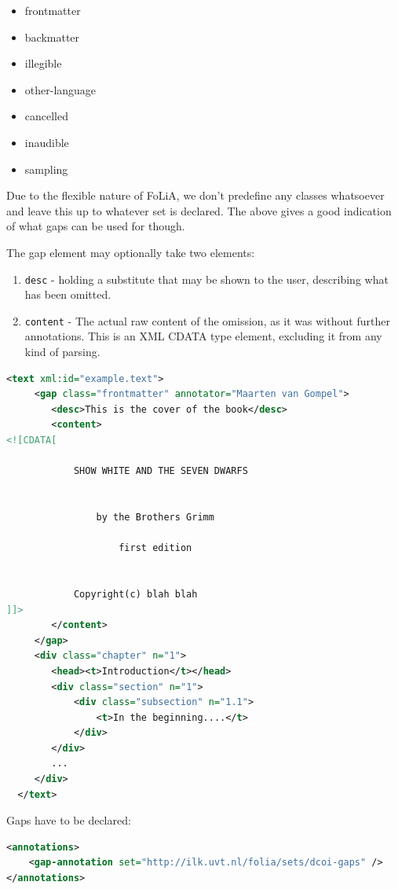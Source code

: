 \documentclass[a4paper,12pt]{report}
\begin{document}
\begin{itemize}
\item frontmatter
\item backmatter
\item illegible
\item other-language
\item cancelled
\item inaudible
\item sampling
\end{itemize}

Due to the flexible nature of FoLiA, we don't predefine any classes whatsoever and leave this up to whatever set is declared. The above gives a good indication of what gaps can be used for though. 

The gap element may optionally take two elements:

\begin{enumerate}
\item \texttt{desc} - holding a substitute that may be shown to the user, describing what has been omitted.
\item \texttt{content} - The actual raw content of the omission, as it was without further annotations. This is an XML CDATA type element, excluding it from any kind of parsing.
\end{enumerate}


\begin{lstlisting}[language=xml]
  <text xml:id="example.text">
     <gap class="frontmatter" annotator="Maarten van Gompel">
        <desc>This is the cover of the book</desc>
        <content>
<![CDATA[        
    
            SHOW WHITE AND THE SEVEN DWARFS
            
            
                by the Brothers Grimm
                
                    first edition
                     
            
            Copyright(c) blah blah
]]>
        </content>
     </gap>
     <div class="chapter" n="1">
        <head><t>Introduction</t></head>
        <div class="section" n="1">
            <div class="subsection" n="1.1">
                <t>In the beginning....</t>
            </div>
        </div>
        ...
     </div>
  </text>
\end{lstlisting}

Gaps have to be declared:

\begin{lstlisting}[language=xml]
<annotations>
    <gap-annotation set="http://ilk.uvt.nl/folia/sets/dcoi-gaps" />
</annotations>
\end{lstlisting}
\end{document}
